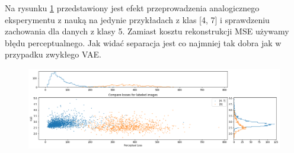 Na rysunku \ref{fig:dfc_mnist_compare} przedstawiony jest efekt przeprowadzenia analogicznego eksperymentu z nauką na jedynie przykładach z klas [4, 7] i sprawdzeniu zachowania dla danych z klasy 5. Zamiast kosztu rekonstrukcji MSE używamy błędu perceptualnego. Jak widać separacja jest co najmniej tak dobra jak w przypadku zwykłego VAE.

\begin{figure}[h!]
    \centering
    \includegraphics[width=1.0\textwidth]{images/dfc_mnist_compare}
    \caption{}
    \label{fig:dfc_mnist_compare}
\end{figure}
